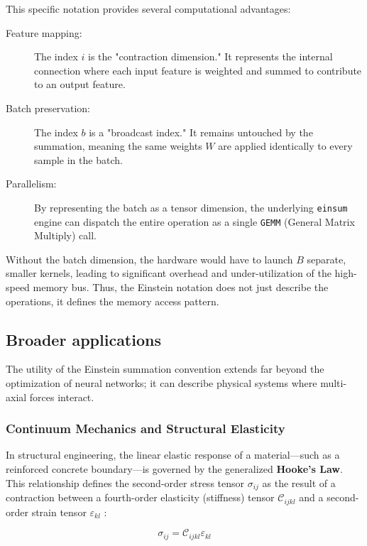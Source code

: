 \documentclass[binding=0.6cm]{sapthesis}
\begin{document}
This specific notation provides several computational advantages:
\begin{description}
	\item [Feature mapping:] The index $i$ is the "contraction dimension." It represents the internal connection where each input feature is weighted and summed to contribute to an output feature.
	\item [Batch preservation:] The index $b$ is a "broadcast index." It remains untouched by the summation, meaning the same weights $W$ are applied identically to every sample in the batch.
	\item [Parallelism:] By representing the batch as a tensor dimension, the underlying \texttt{einsum} engine can dispatch the entire operation as a single \texttt{GEMM} (General Matrix Multiply) call.
\end{description}

Without the batch dimension, the hardware would have to launch $B$ separate, smaller kernels, leading to significant overhead and under-utilization of the high-speed memory bus.
Thus, the Einstein notation does not just describe the operations, it defines the memory access pattern.

\subsection{Broader applications}

The utility of the Einstein summation convention extends far beyond the optimization of neural networks; it can describe physical systems where multi-axial forces interact.

\subsubsection{Continuum Mechanics and Structural Elasticity}

In structural engineering, the linear elastic response of a material—such as a reinforced concrete boundary—is governed by the generalized \textbf{Hooke’s Law}. This relationship defines the second-order stress tensor $\sigma_{ij}$ as the result of a contraction between a fourth-order elasticity (stiffness) tensor $\mathcal{C}_{ijkl}$ and a second-order strain tensor $\varepsilon_{kl}$ \cite{itskov2019tensor}:

\begin{equation}
	\sigma_{ij} = \mathcal{C}_{ijkl} \varepsilon_{kl}
\end{equation}
\end{document}
